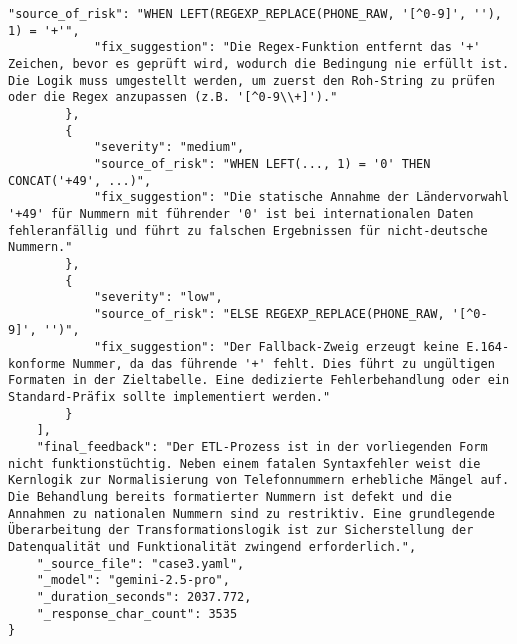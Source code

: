 \begin{lstlisting}[caption={Ausgabe: Gemini 2.5 Pro Anwendungsfall 3 Konsistenzdurchlauf},label={gemini_case3_prompt2}]
            "source_of_risk": "WHEN LEFT(REGEXP_REPLACE(PHONE_RAW, '[^0-9]', ''), 1) = '+'",
            "fix_suggestion": "Die Regex-Funktion entfernt das '+' Zeichen, bevor es geprüft wird, wodurch die Bedingung nie erfüllt ist. Die Logik muss umgestellt werden, um zuerst den Roh-String zu prüfen oder die Regex anzupassen (z.B. '[^0-9\\+]')."
        },
        {
            "severity": "medium",
            "source_of_risk": "WHEN LEFT(..., 1) = '0' THEN CONCAT('+49', ...)",
            "fix_suggestion": "Die statische Annahme der Ländervorwahl '+49' für Nummern mit führender '0' ist bei internationalen Daten fehleranfällig und führt zu falschen Ergebnissen für nicht-deutsche Nummern."
        },
        {
            "severity": "low",
            "source_of_risk": "ELSE REGEXP_REPLACE(PHONE_RAW, '[^0-9]', '')",
            "fix_suggestion": "Der Fallback-Zweig erzeugt keine E.164-konforme Nummer, da das führende '+' fehlt. Dies führt zu ungültigen Formaten in der Zieltabelle. Eine dedizierte Fehlerbehandlung oder ein Standard-Präfix sollte implementiert werden."
        }
    ],
    "final_feedback": "Der ETL-Prozess ist in der vorliegenden Form nicht funktionstüchtig. Neben einem fatalen Syntaxfehler weist die Kernlogik zur Normalisierung von Telefonnummern erhebliche Mängel auf. Die Behandlung bereits formatierter Nummern ist defekt und die Annahmen zu nationalen Nummern sind zu restriktiv. Eine grundlegende Überarbeitung der Transformationslogik ist zur Sicherstellung der Datenqualität und Funktionalität zwingend erforderlich.",
    "_source_file": "case3.yaml",
    "_model": "gemini-2.5-pro",
    "_duration_seconds": 2037.772,
    "_response_char_count": 3535
}
\end{lstlisting}

